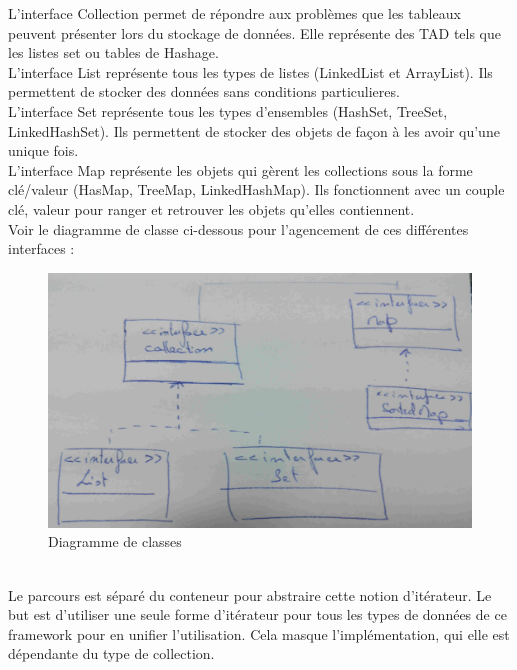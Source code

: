 \documentclass[a4paper,11pt]{article}
\begin{document}
L'interface Collection permet de répondre aux problèmes que les tableaux peuvent présenter lors du stockage de données. Elle représente des TAD tels que les listes set ou tables de Hashage.\\

L'interface List représente tous les types de listes (LinkedList et ArrayList). Ils permettent de stocker des données sans conditions particulieres.\\

L'interface Set représente tous les types d'ensembles (HashSet, TreeSet, LinkedHashSet). Ils permettent de stocker des objets de façon à les avoir qu'une unique fois.\\

L'interface Map représente les objets qui gèrent les collections sous la forme clé/valeur (HasMap, TreeMap, LinkedHashMap). Ils fonctionnent avec un couple {clé, valeur} pour ranger et retrouver les objets qu'elles contiennent.\\

Voir le diagramme de classe ci-dessous pour l'agencement de ces différentes interfaces : \\
\begin{figure}[!h]
  \begin{center}
    \caption{Diagramme de classes}
    \includegraphics[scale=0.1]{image.jpg}
  \end{center}
\end{figure} \\

Le parcours est séparé du conteneur pour abstraire cette notion d'itérateur. Le but est d'utiliser une seule forme d'itérateur pour tous les types de données de ce framework pour en unifier l'utilisation. Cela masque l'implémentation, qui elle est dépendante du type de collection. \\
\end{document}
